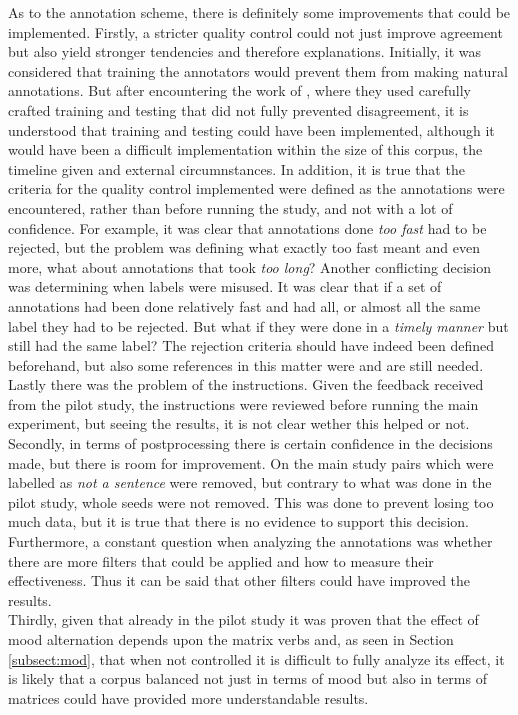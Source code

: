 As to the annotation scheme, there is definitely some improvements that could be implemented. Firstly, a stricter quality control could not just improve agreement but also yield stronger tendencies and therefore explanations. Initially, it was considered that training the annotators would prevent them from making natural annotations. But after encountering the work of \citet{nie2020can}, where they used carefully crafted training and testing that did not fully prevented disagreement, it is understood that training and testing could have been implemented, although it would have been a difficult implementation within the size of this corpus, the timeline given and external circumnstances. In addition, it is true that the criteria for the quality control implemented were defined as the annotations were encountered, rather than before running the study, and not with a lot of confidence. For example, it was clear that annotations done \textit{too fast} had to be rejected, but the problem was defining what exactly too fast meant and even more, what about annotations that took \textit{too long}? Another conflicting decision was determining when labels were misused. It was clear that if a set of annotations had been done relatively fast and had all, or almost all the same label they had to be rejected. But what if they were done in a \textit{timely manner} but still had the same label? The rejection criteria should have indeed been defined beforehand, but also some references in this matter were and are still needed. Lastly there was the problem of the instructions. Given the feedback received from the pilot study, the instructions were reviewed before running the main experiment, but seeing the results, it is not clear wether this helped or not.\\

Secondly, in terms of postprocessing there is certain confidence in the decisions made, but there is room for improvement. On the main study pairs which were labelled as \textit{not a sentence} were removed, but contrary to what was done in the pilot study, whole seeds were not removed. This was done to prevent losing too much data, but it is true that there is no evidence to support this decision. Furthermore, a constant question when analyzing the annotations was whether there are more filters that could be applied and how to measure their effectiveness. Thus it can be said that other filters could have improved the results.\\

Thirdly, given that already in the pilot study it was proven that the effect of mood alternation depends upon the matrix verbs and, as seen in Section \ref{subsect:mod}, that when not controlled it is difficult to fully analyze its effect, it is likely that a corpus balanced not just in terms of mood but also in terms of matrices could have provided more understandable results.\\

